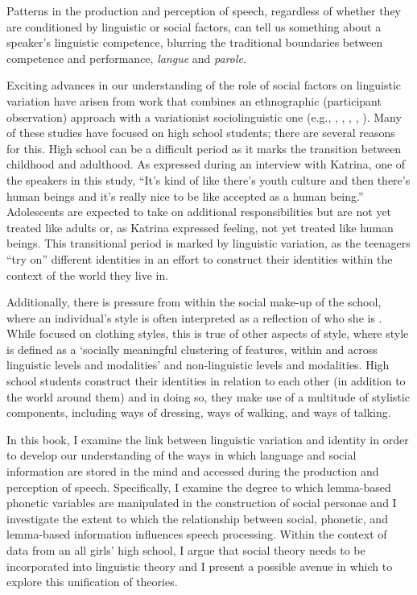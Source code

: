 \noindent Patterns in the production and perception of speech, regardless of whether they are conditioned by linguistic or social factors, can tell us something about a speaker's linguistic competence, blurring the traditional boundaries between competence and performance, \textit{langue} and \textit{parole}.  

Exciting advances in our understanding of the role of social factors on linguistic variation have arisen from work that combines an ethnographic (participant observation) approach with a variationist sociolinguistic one (e.g., , , , , ).  Many of these studies have focused on high school students; there are several reasons for this.  High school can be a difficult period as it marks the transition between childhood and adulthood.  As expressed during an interview with Katrina, one of the speakers in this study, "`It's kind of like there's youth culture and then there's human beings and it's really nice to be like accepted as a human being."'  Adolescents are expected to take on additional responsibilities but are not yet treated like adults or, as Katrina expressed feeling, not yet treated like human beings.  This transitional period is marked by linguistic variation, as the teenagers "`try on"' different identities in an effort to construct their identities within the context of the world they live in.

Additionally, there is pressure from within the social make-up of the school, where an individual's style is often interpreted as a reflection of who she is \cite[2]{pomerantz2008}.  While  focused on clothing styles, this is true of other aspects of style, where style is defined as a `socially meaningful clustering of features, within and across linguistic levels and modalities' \cite{campbellkibleretal2006} and non-linguistic levels and modalities. High school students construct their identities in relation to each other (in addition to the world around them) and in doing so, they make use of a multitude of stylistic components, including ways of dressing, ways of walking, and ways of talking.  

In this book, I examine the link between linguistic variation and identity in order to develop our understanding of the ways in which language and social information are stored in the mind and accessed during the production and perception of speech.  Specifically, I examine the degree to which lemma-based phonetic variables are manipulated in the construction of social personae and I investigate the extent to which the relationship between social, phonetic, and lemma-based information influences speech processing.  Within the context of data from an all girls' high school, I argue that social theory needs to be incorporated into linguistic theory and I present a possible avenue in which to explore this unification of theories.  

